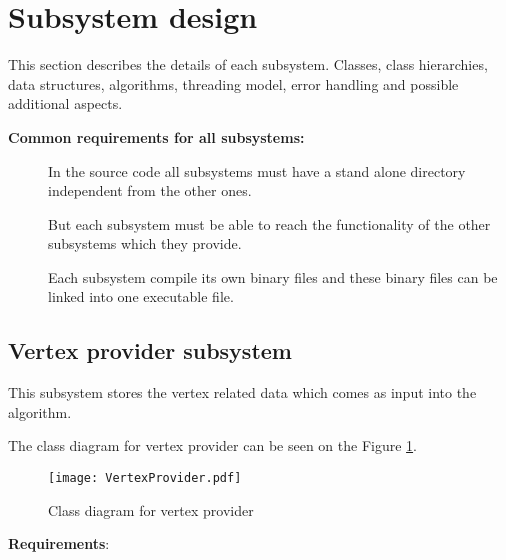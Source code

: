 


\section{Subsystem design}

This section describes the details of each subsystem. Classes, class
hierarchies, data structures, algorithms, threading model, error handling and
possible additional aspects.


\textbf{Common requirements for all subsystems:}

\begin{description}
	\item	[]	In the source code all subsystems
			must have a stand alone directory independent from the other ones.
	
	\item	[] But each subsystem must be
			able to reach the functionality of the other subsystems which they
			provide.

	\item	[] Each subsystem compile its own binary
			files and these binary files can be linked into one executable file.
	
\end{description}



\subsection{Vertex provider subsystem}


This subsystem stores the vertex related data which comes as input into the
algorithm.

The class diagram for vertex provider can be seen on
the Figure \ref{fig:vertexprovider}.

\begin{figure}[h]
	\centering
	\texttt{[image: VertexProvider.pdf]}
	\caption{Class diagram for vertex provider}
	\label{fig:vertexprovider}
\end{figure}


\textbf{Requirements}:


